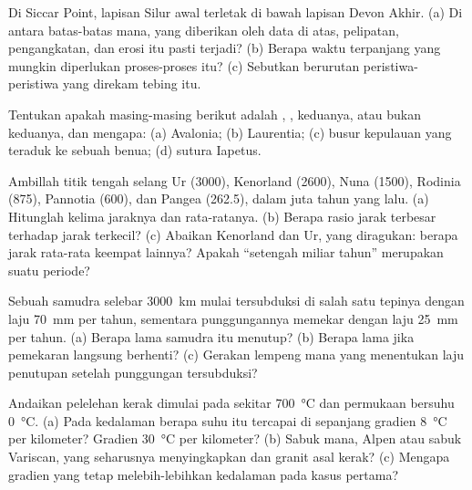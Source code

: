 \begin{exercise}[$\star$]\label{exo:b2:wilson-cycle:3}
Di Siccar Point, lapisan Silur awal terletak di bawah lapisan Devon Akhir. (a) Di antara batas-batas mana,
yang diberikan oleh data di atas, pelipatan, pengangkatan, dan erosi itu pasti terjadi? (b) Berapa
waktu terpanjang yang mungkin diperlukan proses-proses itu? (c) Sebutkan berurutan peristiwa-peristiwa yang direkam tebing itu.
\end{exercise}

\begin{exercise}[$\star$]\label{exo:b2:wilson-cycle:4}
Tentukan apakah masing-masing berikut adalah , , keduanya, atau bukan keduanya, dan mengapa: (a) Avalonia;
(b) Laurentia; (c) busur kepulauan yang teraduk ke sebuah benua; (d) sutura Iapetus.
\end{exercise}

\begin{exercise}[$\star\star$]\label{exo:b2:wilson-cycle:5}
Ambillah titik tengah selang  Ur (3000), Kenorland (2600),
Nuna (1500), Rodinia (875), Pannotia (600), dan Pangea (262.5), dalam juta tahun yang lalu.
(a) Hitunglah kelima jaraknya dan rata-ratanya. (b) Berapa rasio jarak terbesar terhadap
jarak terkecil? (c) Abaikan Kenorland dan Ur, yang diragukan: berapa jarak rata-rata
keempat  lainnya? Apakah ``setengah miliar tahun'' merupakan suatu periode?
\end{exercise}

\begin{exercise}[$\star\star$]\label{exo:b2:wilson-cycle:6}
Sebuah samudra selebar \qty{3000}{km} mulai tersubduksi di salah satu tepinya dengan laju \qty{70}{mm} per tahun,
sementara punggungannya memekar dengan laju \qty{25}{mm} per tahun. (a) Berapa lama samudra itu menutup?
(b) Berapa lama jika pemekaran langsung berhenti? (c) Gerakan lempeng mana yang menentukan laju penutupan setelah
punggungan tersubduksi?
\end{exercise}

\begin{exercise}[$\star\star$]\label{exo:b2:wilson-cycle:7}
Andaikan pelelehan kerak dimulai pada sekitar \qty{700}{\celsius} dan permukaan bersuhu
\qty{0}{\celsius}. (a) Pada kedalaman berapa suhu itu tercapai di sepanjang gradien
\qty{8}{\celsius} per kilometer? Gradien \qty{30}{\celsius} per kilometer? (b) Sabuk mana, Alpen
atau sabuk Variscan, yang seharusnya menyingkapkan  dan granit asal kerak?
(c) Mengapa gradien yang tetap melebih-lebihkan kedalaman pada kasus pertama?
\end{exercise}

